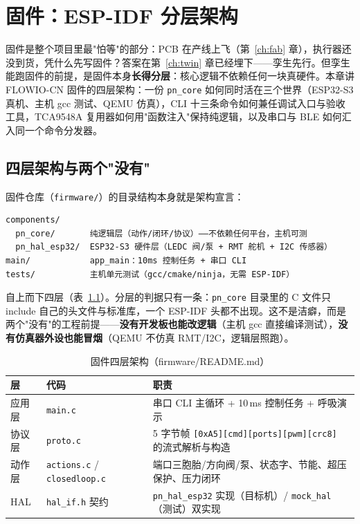 \chapter{固件：ESP-IDF 分层架构}
\label{ch:firmware}

固件是整个项目里最"怕等"的部分：PCB 在产线上飞（第~\ref{ch:fab} 章），执行器还没到货，凭什么先写固件？答案在第~\ref{ch:twin} 章已经埋下——孪生先行。但孪生能跑固件的前提，是固件本身\textbf{长得分层}：核心逻辑不依赖任何一块真硬件。本章讲 FLOWIO-CN 固件的四层架构：一份 \texttt{pn\_core} 如何同时活在三个世界（ESP32-S3 真机、主机 gcc 测试、QEMU 仿真），CLI 十三条命令如何兼任调试入口与验收工具，TCA9548A 复用器如何用"函数注入"保持纯逻辑，以及串口与 BLE 如何汇入同一个命令分发器。

\section{四层架构与两个"没有"}
\label{sec:fw-layers}

固件仓库（\texttt{firmware/}）的目录结构本身就是架构宣言：

\begin{lstlisting}[basicstyle=\small\ttfamily, breaklines=true,
  caption={firmware/ 目录结构（README 摘录）}]
components/
  pn_core/       纯逻辑层（动作/闭环/协议）——不依赖任何平台，主机可测
  pn_hal_esp32/  ESP32-S3 硬件层（LEDC 阀/泵 + RMT 舵机 + I2C 传感器）
main/            app_main：10ms 控制任务 + 串口 CLI
tests/           主机单元测试（gcc/cmake/ninja，无需 ESP-IDF）
\end{lstlisting}

自上而下四层（表~\ref{tab:fw-layers}）。分层的判据只有一条：\texttt{pn\_core} 目录里的 C 文件只 include 自己的头文件与标准库，一个 ESP-IDF 头都不出现。这不是洁癖，而是两个"没有"的工程前提——\textbf{没有开发板也能改逻辑}（主机 gcc 直接编译测试），\textbf{没有仿真器外设也能冒烟}（QEMU 不仿真 RMT/I2C，逻辑层照跑）。

\begin{table}[htbp]
  \centering
  \caption{固件四层架构（firmware/README.md）}
  \label{tab:fw-layers}
  \begin{tabular}{lp{4.2cm}p{5.2cm}}
    \toprule
    层 & 代码 & 职责 \\
    \midrule
    应用层 & \texttt{main.c} & 串口 CLI 主循环 + 10\,ms 控制任务 + 呼吸演示 \\
    协议层 & \texttt{proto.c} & 5 字节帧 \texttt{[0xA5][cmd][ports][pwm][crc8]} 的流式解析与构造 \\
    动作层 & \texttt{actions.c} / \texttt{closedloop.c} & 端口三胞胎/方向阀/泵、状态字、节能、超压保护、压力闭环 \\
    HAL & \texttt{hal\_if.h} 契约 & \texttt{pn\_hal\_esp32} 实现（目标机）/ \texttt{mock\_hal}（测试）双实现 \\
    \bottomrule
  \end{tabular}
\end{table}

